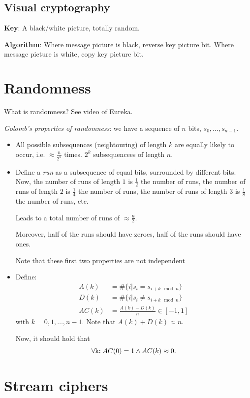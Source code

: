 \documentclass[language=english,number=]{homework}
\begin{document}
\subsection{Visual cryptography}

\textbf{Key}: A black/white picture, totally random.

\textbf{Algorithm}: Where message picture is black, reverse key picture bit.
Where message picture is white, copy key picture bit.

\newpage
\section{Randomness}

What is randomness?
See video of Eureka.

\textit{Golomb's properties of randomness}: we have a sequence of $n$ bits, $s_0, \dots, s_{n-1}$.
\begin{itemize}
\item All possible subsequences (neightouring) of length $k$ are equally likely to occur, i.e. $\approx \frac{n}{2^k}$ times.
$2^k$ subsequencees of length $n$.
\item Define a \textit{run} as a subsequence of equal bits, surrounded by different bits.
Now, the number of runs of length $1$ is $\frac{1}{2}$ the number of runs, the number of runs of length $2$ is $\frac{1}{4}$ the number of runs, the number of runs of length $3$ is $\frac{1}{8}$ the number of runs, etc.

Leads to a total number of runs of $\approx \frac{n}{2}$.

Moreover, half of the runs should have zeroes, half of the runs should have ones.

Note that these first two properties are not independent
\item Define:
\begin{align*}
A(k) &= \# \{i | s_i = s_{i + k \mod n} \} \\
D(k) &= \# \{i | s_i \ne s_{i + k \mod n} \} \\
AC(k) &= \frac{A(k) - D(k)}{n} \in [-1,1]
\end{align*}
with $k = 0, 1, \dots, n-1$.
Note that $A(k) + D(k) \approx n$.

Now, it should hold that
\[
\forall $k$ : AC(0) = 1 \wedge AC(k) \approx 0.
\]
\end{itemize}

\newpage
\section{Stream ciphers}
\end{document}
